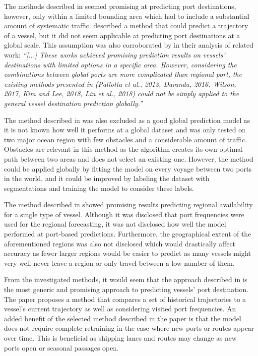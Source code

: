 The methods described in \cite{pallotta} seemed promising at predicting port destinations, however, only within a limited bounding area which had to include a substantial amount of systematic traffic. \cite{Daranda2016NeuralNA} described a method that could predict a trajectory of a vessel, but it did not seem applicable at predicting port destinations at a global scale. This assumption was also corroborated by \cite{Zhang2020AISApproach} in their analysis of related work: \textit{“[...] These works achieved promising prediction results on vessels’ destinations with limited options in a specific area. However, considering the combinations between global ports are more complicated than regional port, the existing methods presented in (Pallotta et al., 2013, Daranda, 2016, Wilson, 2017, Kim and Lee, 2018, Lin et al., 2018) could not be simply applied to the general vessel destination prediction globally.”}

The method described in \cite{Pelizzari2016GeneticAF} was also excluded as a good global prediction model as it is not known how well it performs at a global dataset and was only tested on two major ocean region with few obstacles and a considerable amount of traffic. Obstacles are relevant in this method as the algorithm creates its own optimal path between two areas and does not select an existing one. However, the method could be applied globally by fitting the model on every voyage between two ports in the world, and it could be improved by labeling the dataset with segmentations and training the model to consider these labels.

The method described in \cite{lechtenberg2019} showed promising results predicting regional availability for a single type of vessel. Although it was disclosed that port frequencies were used for the regional forecasting, it was not disclosed how well the model performed at port-based predictions. Furthermore, the geographical extent of the aforementioned regions was also not disclosed which would drastically affect accuracy as fewer larger regions would be easier to predict as many vessels might very well never leave a region or only travel between a low number of them.

From the investigated methods, it would seem that the approach described in \cite{Zhang2020AISApproach} is the most generic and promising approach to predicting vessels’ port destination. The paper proposes a method that compares a set of historical trajectories to a vessel’s current trajectory as well as considering visited port frequencies. An added benefit of the selected method described in the paper is that the model does not require complete retraining in the case where new ports or routes appear over time. This is beneficial as shipping lanes and routes may change as new ports open or seasonal passages open.

